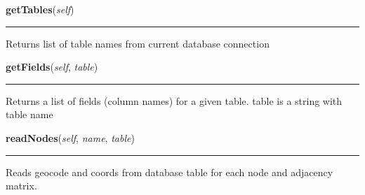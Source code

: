     \label{Epigrass:epiplay:viewer:getTables}

    \vspace{0.5ex}

    \begin{boxedminipage}{\textwidth}

    \raggedright \textbf{getTables}(\textit{self})

    \vspace{-1.5ex}

    \rule{\textwidth}{0.5\fboxrule}
    Returns list of table names from current database connection

    \vspace{1ex}

    \end{boxedminipage}

    \label{Epigrass:epiplay:viewer:getFields}

    \vspace{0.5ex}

    \begin{boxedminipage}{\textwidth}

    \raggedright \textbf{getFields}(\textit{self}, \textit{table})

    \vspace{-1.5ex}

    \rule{\textwidth}{0.5\fboxrule}
    Returns a list of fields (column names) for a given table. table is a 
    string with table name

    \vspace{1ex}

    \end{boxedminipage}

    \label{Epigrass:epiplay:viewer:readNodes}

    \vspace{0.5ex}

    \begin{boxedminipage}{\textwidth}

    \raggedright \textbf{readNodes}(\textit{self}, \textit{name}, \textit{table})

    \vspace{-1.5ex}

    \rule{\textwidth}{0.5\fboxrule}
    Reads geocode and coords from database table for each node and 
    adjacency matrix.

    \vspace{1ex}

    \end{boxedminipage}


